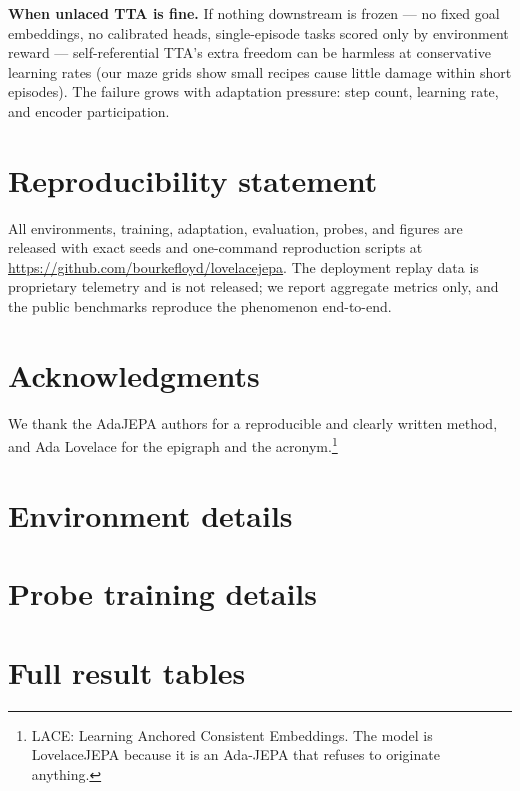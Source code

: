 \documentclass{article}
\newcommand{\lace}{\textsc{LACE}}
\newcommand{\lovelace}{LovelaceJEPA}
\begin{document}
\textbf{When unlaced TTA is fine.} If nothing downstream is frozen --- no
fixed goal embeddings, no calibrated heads, single-episode tasks scored only
by environment reward --- self-referential TTA's extra freedom can be harmless
at conservative learning rates (our maze grids show small recipes cause little
damage within short episodes). The failure grows with adaptation pressure:
step count, learning rate, and encoder participation.

\section*{Reproducibility statement}
All environments, training, adaptation, evaluation, probes, and figures are
released with exact seeds and one-command reproduction scripts at
\url{https://github.com/bourkefloyd/lovelacejepa}. The
deployment replay data is proprietary telemetry and is not released; we
report aggregate metrics only, and the public benchmarks reproduce the
phenomenon end-to-end.

\section*{Acknowledgments}
We thank the AdaJEPA authors for a reproducible and clearly written method,
and Ada Lovelace for the epigraph and the acronym.\footnote{\lace{}: Learning
Anchored Consistent Embeddings. The model is \lovelace{} because it is an
Ada-JEPA that refuses to originate anything.}




\appendix

\section{Environment details}
\label{app:env}

\section{Probe training details}
\label{app:probes}

\section{Full result tables}
\label{app:tables}
\end{document}
